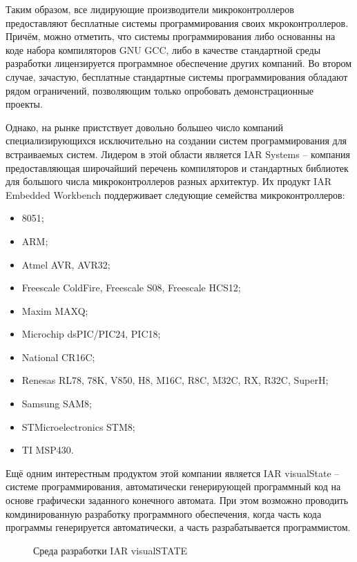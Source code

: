 Таким образом, все лидирующие производители микроконтроллеров предоставляют
бесплатные системы программирования своих мкроконтроллеров.
Причём, можно отметить, что системы программирования либо основанны на коде 
набора компиляторов GNU GCC, либо в качестве стандартной среды разработки лицензируется
программное обеспечение других компаний. Во втором случае, зачастую, бесплатные
стандартные системы программирования обладают рядом ограничений, позволяющим только
опробовать демонстрационные проекты.

Однако, на рынке пристствует довольно большео число компаний специализирующихся
исключительно на создании систем программирования для встраиваемых систем. Лидером
в этой области является IAR Systems -- компания предоставляющая широчайший перечень компиляторов и стандартных библиотек для большого числа микроконтроллеров разных архитектур.
Их продукт IAR Embedded Workbench поддерживает следующие семейства микроконтроллеров:
\begin{itemize}
	\item{} 8051;
	\item{} ARM;
	\item{} Atmel AVR, AVR32;
	\item{} Freescale ColdFire, Freescale S08, Freescale HCS12;
	\item{} Maxim MAXQ;
	\item{} Microchip dsPIC/PIC24, PIC18;
	\item{} National CR16C;
	\item{} Renesas RL78, 78K, V850, H8, M16C, R8C, M32C, RX, R32C, SuperH;
	\item{} Samsung SAM8;
	\item{} STMicroelectronics STM8;
	\item{} TI MSP430.
\end{itemize}
Ещё одним интерестным продуктом этой компании является IAR visualState -- системе
программирования, автоматически генерирующей программный код на основе графически
заданного конечного автомата. При этом возможно проводить комдинированную разработку
программного обеспечения, когда часть кода программы генерируется автоматически, а часть
разрабатывается программистом.

\begin{figure}[ht]
	\caption{Среда разработки IAR visualSTATE}
	\label{img:iarVis}
\end{figure}

\newpage{}


